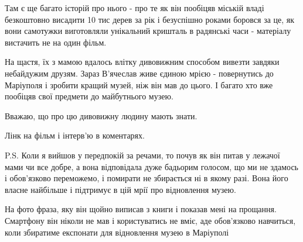 Там є ще багато історій про нього - про те як він пообіцяв міській владі
безкоштовно висадити 10 тис дерев за рік і безуспішно роками боровся за це, як
вони самотужки виготовляли унікальний кришталь в радянські часи - матеріалу
вистачить не на один фільм.

На щастя, їх з мамою вдалось влітку дивовижним способом вивезти завдяки
небайдужим друзям. Зараз В'ячеслав живе єдиною мрією - повернутись до Маріуполя
і зробити кращий музей, ніж він мав до цього. І багато хто вже пообіцяв свої
предмети до майбутнього музею.

Вважаю, що про цю дивовижну людину мають знати. 

Лінк на фільм і інтерв'ю в коментарях.

P.S. Коли я вийшов у передпокій за речами, то почув як він питав у лежачої мами
чи все добре, а вона відповідала дуже бадьорим голосом, що ми не здамось і
обов'язково переможемо, і помирати не збирається ні в якому разі. Вона його
власне найбільше і підтримує в цій мрії про відновлення музею.

На фото фраза, яку він щойно виписав з книги і показав мені на прощання.
Смартфону він ніколи не мав і користуватись не вміє, аде обов'язково навчиться,
коли збиратиме експонати для відновлення музею в Маріуполі

